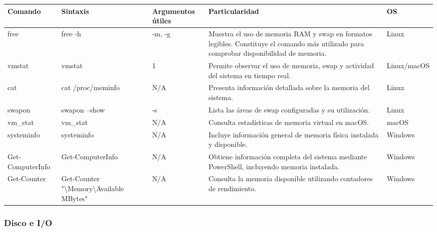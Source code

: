 \documentclass[a4paper,10pt]{article}
\begin{document}
\begin{longtable}{|p{2.8cm}|p{3.2cm}|p{4cm}|p{5.4cm}|p{1.5cm}|}

\hline
Comando &
Sintaxis &
Argumentos útiles &
Particularidad &
OS
\\
\hline
\endhead

free &
free -h &
-m, -g &
Muestra el uso de memoria RAM y swap en formatos legibles. Constituye el comando más utilizado para comprobar disponibilidad de memoria. &
Linux
\\
\hline

vmstat &
vmstat &
1 &
Permite observar el uso de memoria, swap y actividad del sistema en tiempo real. &
Linux/macOS
\\
\hline

cat &
cat /proc/meminfo &
N/A &
Presenta información detallada sobre la memoria del sistema. &
Linux
\\
\hline

swapon &
swapon --show &
-s &
Lista las áreas de swap configuradas y su utilización. &
Linux
\\
\hline

vm\_stat &
vm\_stat &
N/A &
Consulta estadísticas de memoria virtual en macOS. &
macOS
\\
\hline

systeminfo &
systeminfo &
N/A &
Incluye información general de memoria física instalada y disponible. &
Windows
\\
\hline

Get-ComputerInfo &
Get-ComputerInfo &
N/A &
Obtiene información completa del sistema mediante PowerShell, incluyendo memoria instalada. &
Windows
\\
\hline

Get-Counter &
Get-Counter "\textbackslash Memory\textbackslash Available MBytes" &
N/A &
Consulta la memoria disponible utilizando contadores de rendimiento. &
Windows
\\
\hline

\end{longtable}


\subsubsection{Disco e I/O}
\end{document}

